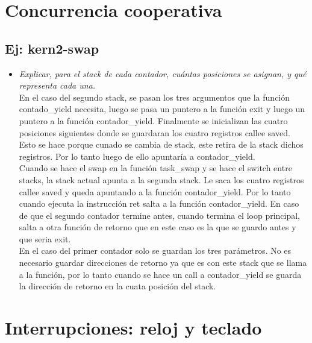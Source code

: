 \documentclass[a4paper, 12pt]{article}
\begin{document}
	\section{Concurrencia cooperativa}
		\subsection{Ej: kern2-swap}
		\begin{itemize}
			\item \textit{Explicar, para el stack de cada contador, cuántas
			posiciones se asignan, y qué representa cada una.\\}
			En el caso del segundo stack, se pasan los tres argumentos que la
			función contado\_yield necesita, luego se pasa un puntero a la función
			exit y luego un puntero a la función contador\_yield. Finalmente se
			inicializan las cuatro posiciones siguientes donde se guardaran los
			cuatro registros callee saved. Esto se hace porque cunado se cambia de
			stack, este retira de la stack dichos registros. Por lo tanto
			luego de ello apuntaría a contador\_yield.\\
			Cuando se hace el swap en la función task\_swap y se hace el switch
			entre stacks, la stack actual apunta a la segunda stack. Le saca los
			cuatro registros callee saved y queda apuntando a la función
			contador\_yield. Por lo tanto cuando ejecuta la instrucción ret salta a
			la función contador\_yield. En caso de que el segundo contador termine
			antes, cuando termina el loop principal, salta a otra función de retorno
			que en este caso es la que se guardo antes  y que seria exit.\\
			En el caso del primer contador solo se guardan los tres parámetros. No
			es necesario guardar direcciones de retorno ya que es con este stack que
			se llama a la función, por lo tanto cuando se hace un call a
			contador\_yield se guarda la dirección de retorno en la cuata posición
			del stack.
		\end{itemize}
	\section{Interrupciones: reloj y teclado}
\end{document}
